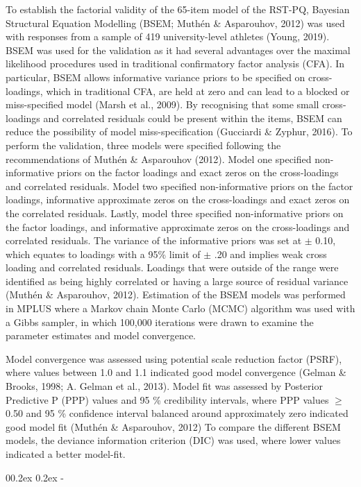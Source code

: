 \documentclass[
  english,
  man,floatsintext]{apa6}
\makeatletter
\renewcommand{\subparagraph}[1]{\@startsection{subparagraph}{5}{1em}%
  {0\baselineskip \@plus 0.2ex \@minus 0.2ex}%
  {-\z@\relax}%
  {\normalfont\normalsize\itshape\hspace{\parindent}{#1}\textit{\addperi}}{\relax}}
\makeatother
\begin{document}
To establish the factorial validity of the 65-item model of the RST-PQ, Bayesian Structural Equation Modelling (BSEM; Muthén \& Asparouhov, 2012) was used with responses from a sample of 419 university-level athletes (Young, 2019).
BSEM was used for the validation as it had several advantages over the maximal likelihood procedures used in traditional confirmatory factor analysis (CFA).
In particular, BSEM allows informative variance priors to be specified on cross-loadings, which in traditional CFA, are held at zero and can lead to a blocked or miss-specified model (Marsh et al., 2009).
By recognising that some small cross-loadings and correlated residuals could be present within the items, BSEM can reduce the possibility of model miss-specification (Gucciardi \& Zyphur, 2016).
To perform the validation, three models were specified following the recommendations of Muthén \& Asparouhov (2012).
Model one specified non-informative priors on the factor loadings and exact zeros on the cross-loadings and correlated residuals.
Model two specified non-informative priors on the factor loadings, informative approximate zeros on the cross-loadings and exact zeros on the correlated residuals.
Lastly, model three specified non-informative priors on the factor loadings, and informative approximate zeros on the cross-loadings and correlated residuals.
The variance of the informative priors was set at \(\pm\) 0.10, which equates to loadings with a 95\% limit of \(\pm\) .20 and implies weak cross loading and correlated residuals.
Loadings that were outside of the range were identified as being highly correlated or having a large source of residual variance (Muthén \& Asparouhov, 2012).
Estimation of the BSEM models was performed in MPLUS where a Markov chain Monte Carlo (MCMC) algorithm was used with a Gibbs sampler, in which 100,000 iterations were drawn to examine the parameter estimates and model convergence.

Model convergence was assessed using potential scale reduction factor (PSRF), where values between 1.0 and 1.1 indicated good model convergence (Gelman \& Brooks, 1998; A. Gelman et al., 2013).
Model fit was assessed by Posterior Predictive P (PPP) values and 95 \% credibility intervals, where PPP values \(\geqslant\) 0.50 and 95 \% confidence interval balanced around approximately zero indicated good model fit (Muthén \& Asparouhov, 2012)
To compare the different BSEM models, the deviance information criterion (DIC) was used, where lower values indicated a better model-fit.

\hypertarget{results}{%
\subparagraph{Results}\label{results}}
\end{document}
